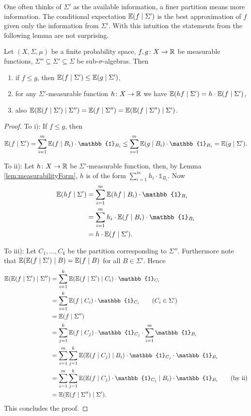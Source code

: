One often thinks of $\Sigma'$ as the available information, a finer partition means more information. The conditional expectation $\mathbb{E}(f\mid \Sigma')$ is the best approximation of $f$ given only the information from $\Sigma'$. 
With this intuition the statements from the following lemma are not surprising. 
\begin{lemma}\label{lem:condExp}
Let $(X,\Sigma,\mu)$ be a finite probability space, $f,g\colon X\to \mathbb{R}$ be measurable functions, $\Sigma''\subseteq\Sigma'\subseteq\Sigma$ be sub-$\sigma$-algebras. Then
\begin{enumerate}[label=\roman*)]
\item if $f\leq g$, then $\mathbb{E}(f\mid \Sigma')\leq\mathbb{E}(g\mid \Sigma')$,
\item for any $\Sigma'$-measurable function $h\colon X\to\mathbb{R}$ we have $\mathbb{E}(h f\mid\Sigma')=h\cdot\mathbb{E}(f\mid\Sigma')$,
\item also $\mathbb{E}(\mathbb{E}(f\mid \Sigma')\mid\Sigma'')=\mathbb{E}(f\mid\Sigma'')=\mathbb{E}(\mathbb{E}(f\mid \Sigma'')\mid\Sigma')$.
\end{enumerate}
\end{lemma}
\begin{proof}
To i): If $f\leq g$, then
\[\E(f\mid \Sigma')=\sum_{i=1}^m\E(f\mid B_i)\cdot \mathbb{1}_{B_i}\leq \sum_{i=1}^m\E(g\mid B_i)\cdot \mathbb{1}_{B_i}=\E(g\mid \Sigma').\]


To ii): Let $h\colon X\to\mathbb{R}$ be $\Sigma'$-measurable function, then, by Lemma \ref{lem:measurabilityForm}, $h$ is of the form $\sum_{i=1}^{m}h_i\cdot \mathbb{1}_{B_i}$. Now 
\begin{align*}
\E(h f\mid\Sigma')&=\sum_{i=1}^{m}\E(hf\mid B_i)\cdot\mathbb{1}_{B_i}\\
&=\sum_{i=1}^{m}h_i\cdot\E(f\mid B_i)\cdot\mathbb{1}_{B_i}\\
&=h\cdot\E(f\mid\Sigma').
\end{align*}

To iii): Let $C_1,\dots,C_k$ be the partition corresponding to $\Sigma''$. Furthermore note that $\mathbb{E}(\mathbb{E}(f\mid \Sigma')\mid B)=\mathbb{E}(f\mid B)$ for all $B\in\Sigma'$. Hence
\begin{align*}
\E(\E(f\mid \Sigma')\mid\Sigma'')&=\sum_{i=1}^{k}\E(\E(f\mid \Sigma')\mid C_i)\cdot\mathbb{1}_{C_i}\\
&=\sum_{i=1}^{k}\E(f\mid C_i)\cdot\mathbb{1}_{C_i}\tag{$C_i\in\Sigma'$}\\
&=\E(f\mid\Sigma'')\\
&=\sum_{j=1}^{k}\E(f\mid C_j)\cdot\mathbb{1}_{C_j}\cdot\sum_{i=1}^{m}\mathbb{1}_{B_i}\\
&=\sum_{i=1}^{m}\sum_{j=1}^{k}\E(\E(f\mid C_j)\mid B_i)\cdot\mathbb{1}_{C_j}\cdot\mathbb{1}_{B_i}\\
&=\sum_{i=1}^{m}\sum_{j=1}^{k}\E(\E(f\mid C_j)\cdot\mathbb{1}_{C_j}\mid B_i)\cdot\mathbb{1}_{B_i}\tag{by ii}\\
&=\E(\E(f\mid \Sigma'')\mid\Sigma').
\end{align*}
This concludes the proof.
\end{proof}


